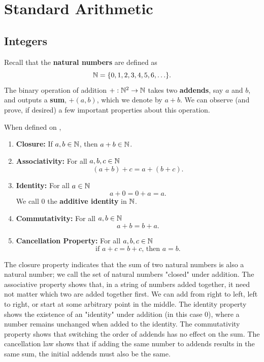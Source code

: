 \chapter{Standard Arithmetic}\label{ch:arith}

    \section{Integers}\label{sec:ints}
        Recall that the \textbf{natural numbers} are defined as
        \[\mathbb{N} = \{0,1,2,3,4,5,6,\ldots\}.\] 
        The binary operation of addition $+:\mathbb{N}^2 \to \mathbb{N}$ takes two \textbf{addends}, say $a$ and $b$, and outputs a \textbf{sum}, $+(a,b)$, which we denote by $a + b$. We can observe (and prove, if desired) a few important properties about this operation.

        \begin{theorem}\label{thm:PoA}
            When defined on \N,
            \begin{enumerate}
                \item \textbf{Closure:} If $a, b \in \mathbb{N}$, then $a + b \in \mathbb{N}$.
                \item \textbf{Associativity:} For all $a,b,c \in \mathbb{N}$ $$(a+b)+c = a+(b+c).$$
                \item \textbf{Identity:} For all $a \in \mathbb{N}$ $$a+0=0+a=a.$$ We call $0$ the \textbf{additive identity} in $\mathbb{N}$.
                \item \textbf{Commutativity:} For all $a,b \in \mathbb{N}$ $$a+b=b+a.$$
                \item \textbf{Cancellation Property:} For all $a,b,c \in \mathbb{N}$ $$\text{if } a+c = b+c \text{, then } a = b.$$
            \end{enumerate}
        \end{theorem}

        The closure property indicates that the sum of two natural numbers is also a natural number; we call the set of natural numbers "closed" under addition. The associative property shows that, in a string of numbers added together, it need not matter which two are added together first. We can add from right to left, left to right, or start at some arbitrary point in the middle. The identity property shows the existence of an "identity" under addition (in this case $0$), where a number remains unchanged when added to the identity. The commutativity property shows that switching the order of addends has no effect on the sum. The cancellation law shows that if adding the same number to addends results in the same sum, the initial addends must also be the same.

